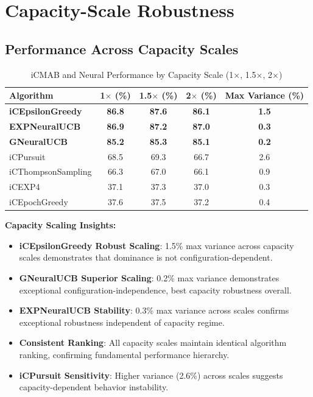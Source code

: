 \documentclass[12pt,a4paper]{article}
\newcommand{\primarytext}[1]{\textcolor{primaryblue}{\textbf{#1}}}
\newcommand{\secondarytext}[1]{\textcolor{secondaryblue}{\textbf{#1}}}
\newcommand{\warning}[1]{\textcolor{warningred}{\textbf{#1}}}
\newcommand{\legacy}[1]{\textcolor{legacycolor}{\textbf{#1}}}
\newcommand{\neural}[1]{\textcolor{neuralcolor}{\textbf{#1}}}
\begin{document}
\section{Capacity-Scale Robustness}

\subsection{Performance Across Capacity Scales}

\begin{table}[H]
\centering
\caption{iCMAB and Neural Performance by Capacity Scale (1$\times$, 1.5$\times$, 2$\times$)}
\label{tab:capacity-scale}
\begin{tabular}{@{}lcccc@{}}
\toprule
\textbf{Algorithm} & \textbf{1$\times$ (\%)} & \textbf{1.5$\times$ (\%)} & \textbf{2$\times$ (\%)} & \textbf{Max Variance (\%)} \\
\midrule
\primarytext{iCEpsilonGreedy}   & \primarytext{86.8} & \primarytext{87.6} & \primarytext{86.1} & \primarytext{1.5} \\
\legacy{EXPNeuralUCB}           & \legacy{86.9} & \legacy{87.2} & \legacy{87.0} & \legacy{0.3} \\
\neural{GNeuralUCB}            & \neural{85.2} & \neural{85.3} & \neural{85.1} & \neural{0.2} \\
iCPursuit                       & 68.5 & 69.3 & 66.7 & 2.6 \\
iCThompsonSampling              & 66.3 & 67.0 & 66.1 & 0.9 \\
iCEXP4                          & 37.1 & 37.3 & 37.0 & 0.3 \\
iCEpochGreedy                   & 37.6 & 37.5 & 37.2 & 0.4 \\
\bottomrule
\end{tabular}
\end{table}

\textbf{Capacity Scaling Insights:}
\begin{itemize}
\item \primarytext{iCEpsilonGreedy Robust Scaling}: 1.5\% max variance across capacity scales demonstrates that dominance is not configuration-dependent.
\item \neural{GNeuralUCB Superior Scaling}: 0.2\% max variance demonstrates exceptional configuration-independence, best capacity robustness overall.
\item \legacy{EXPNeuralUCB Stability}: 0.3\% max variance across scales confirms exceptional robustness independent of capacity regime.
\item \secondarytext{Consistent Ranking}: All capacity scales maintain identical algorithm ranking, confirming fundamental performance hierarchy.
\item \warning{iCPursuit Sensitivity}: Higher variance (2.6\%) across scales suggests capacity-dependent behavior instability.
\end{itemize}
\end{document}
